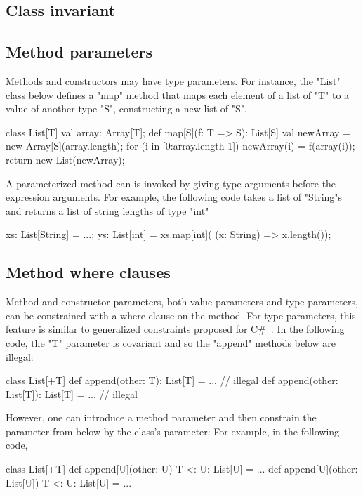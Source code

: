 \documentclass[preprint,nocopyrightspace,9pt]{sigplanconf}
\begin{document}
\subsection{Class invariant}

\subsection{Method parameters}

Methods and constructors may have type parameters.
For instance, the \xcd"List" class below defines a \xcd"map"
method that maps each element of a list of \xcd"T"
to a value of another type \xcd"S", constructing a new list of
\xcd"S".
\begin{xten}
class List[T] {
    val array: Array[T];
    def map[S](f: T => S): List[S] {
        val newArray = new Array[S](array.length);
        for (i in [0:array.length-1]) {
            newArray(i) = f(array(i));
        }
        return new List(newArray);
    }
}
\end{xten}


A parameterized method can is invoked by giving type arguments before the
expression arguments.  For example, the following code takes a
list of \xcd"String"s and returns a list of string lengths of
type \xcd"int"
\begin{xten}
xs: List[String] = ...;
ys: List[int] = xs.map[int](
        (x: String) => x.length());
\end{xten}

\subsection{Method where clauses}

Method and constructor parameters, both value parameters and
type parameters,
can be constrained with a where clause on the method.
For type parameters,
this feature is similar to generalized constraints proposed for
C\#~\cite{emir06}.
%
In the following code, the \xcd"T" parameter is covariant
and so the \xcd"append" methods below are illegal:
\begin{xten}
class List[+T] {
   def append(other: T): List[T] = { ... }
        // illegal
   def append(other: List[T]): List[T] = { ... }
        // illegal
}
\end{xten}
%
However, one can introduce a method parameter and then constrain
the parameter from below by the class's parameter:
For example, in the following code,
\begin{xten}
class List[+T] {
   def append[U](other: U)
        {T <: U}: List[U] = { ... }
   def append[U](other: List[U])
        {T <: U}: List[U] = { ... }
}
\end{xten}
\end{document}
